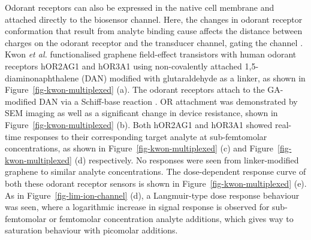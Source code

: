 \documentclass[
  a4paper,
]{scrbook}
\begin{document}
Odorant receptors can also be expressed in the native cell membrane and
attached directly to the biosensor channel. Here, the changes in odorant
receptor conformation that result from analyte binding cause affects the
distance between charges on the odorant receptor and the transducer
channel, gating the channel \autocite{Kwon2015,Dung2018}. Kwon \emph{et
al.} functionalised graphene field-effect transistors with human odorant
receptors hOR2AG1 and hOR3A1 using non-covalently attached
1,5-diaminonaphthalene (DAN) modified with glutaraldehyde as a linker,
as shown in Figure~\ref{fig-kwon-multiplexed} (a). The odorant receptors
attach to the GA-modified DAN via a Schiff-base reaction
\autocite{Subasi2022}. OR attachment was demonstrated by SEM imaging as
well as a significant change in device resistance, shown in
Figure~\ref{fig-kwon-multiplexed} (b). Both hOR2AG1 and hOR3A1 showed
real-time responses to their corresponding target analyte at
sub-femtomolar concentrations, as shown in
Figure~\ref{fig-kwon-multiplexed} (c) and
Figure~\ref{fig-kwon-multiplexed} (d) respectively. No responses were
seen from linker-modified graphene to similar analyte concentrations.
The dose-dependent response curve of both these odorant receptor sensors
is shown in Figure~\ref{fig-kwon-multiplexed} (e). As in
Figure~\ref{fig-lim-ion-channel} (d), a Langmuir-type dose response
behaviour was seen, where a logarithmic increase in signal response is
observed for sub-femtomolar or femtomolar concentration analyte
additions, which gives way to saturation behaviour with picomolar
additions.
\end{document}
